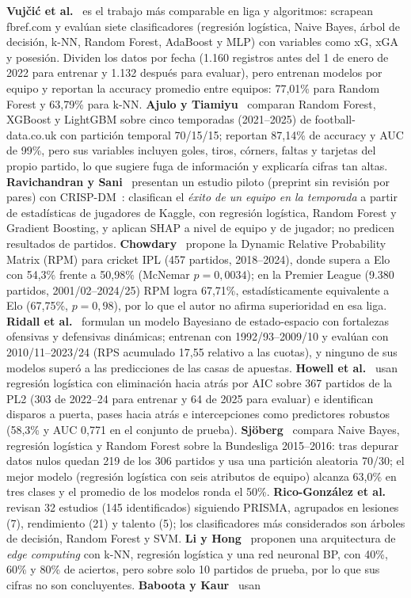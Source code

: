 \documentclass[12pt,letterpaper,oneside]{report}
\begin{document}
\textbf{Vujčić et al.}~\cite{vujcic2026supervised} es el trabajo más comparable en liga y algoritmos: scrapean fbref.com y evalúan siete clasificadores (regresión logística, Naive Bayes, árbol de decisión, k-NN, Random Forest, AdaBoost y MLP) con variables como xG, xGA y posesión. Dividen los datos por fecha (1.160 registros antes del 1 de enero de 2022 para entrenar y 1.132 después para evaluar), pero entrenan modelos por equipo y reportan la accuracy promedio entre equipos: 77,01\% para Random Forest y 63,79\% para k-NN. \textbf{Ajulo y Tiamiyu}~\cite{ajulo2026ml} comparan Random Forest, XGBoost y LightGBM sobre cinco temporadas (2021--2025) de football-data.co.uk con partición temporal 70/15/15; reportan 87,14\% de accuracy y AUC de 99\%, pero sus variables incluyen goles, tiros, córners, faltas y tarjetas del propio partido, lo que sugiere fuga de información y explicaría cifras tan altas. \textbf{Ravichandran y Sani}~\cite{ravichandran2026framework} presentan un estudio piloto (preprint sin revisión por pares) con CRISP-DM~\cite{wirth2000crisp}: clasifican el \textit{éxito de un equipo en la temporada} a partir de estadísticas de jugadores de Kaggle, con regresión logística, Random Forest y Gradient Boosting, y aplican SHAP a nivel de equipo y de jugador; no predicen resultados de partidos. \textbf{Chowdary}~\cite{chowdary2026dynamic} propone la Dynamic Relative Probability Matrix (RPM) para cricket IPL (457 partidos, 2018--2024), donde supera a Elo con 54,3\% frente a 50,98\% (McNemar $p=0{,}0034$); en la Premier League (9.380 partidos, 2001/02--2024/25) RPM logra 67,71\%, estadísticamente equivalente a Elo (67,75\%, $p=0{,}98$), por lo que el autor no afirma superioridad en esa liga. \textbf{Ridall et al.}~\cite{ridall2025bayesian} formulan un modelo Bayesiano de estado-espacio con fortalezas ofensivas y defensivas dinámicas; entrenan con 1992/93--2009/10 y evalúan con 2010/11--2023/24 (RPS acumulado 17,55 relativo a las cuotas), y ninguno de sus modelos superó a las predicciones de las casas de apuestas. \textbf{Howell et al.}~\cite{howell2026winning} usan regresión logística con eliminación hacia atrás por AIC sobre 367 partidos de la PL2 (303 de 2022--24 para entrenar y 64 de 2025 para evaluar) e identifican disparos a puerta, pases hacia atrás e intercepciones como predictores robustos (58,3\% y AUC 0,771 en el conjunto de prueba). \textbf{Sjöberg}~\cite{sjoborg2023football} compara Naive Bayes, regresión logística y Random Forest sobre la Bundesliga 2015--2016: tras depurar datos nulos quedan 219 de los 306 partidos y usa una partición aleatoria 70/30; el mejor modelo (regresión logística con seis atributos de equipo) alcanza 63,0\% en tres clases y el promedio de los modelos ronda el 50\%. \textbf{Rico-González et al.}~\cite{ricogonzalez2023ml} revisan 32 estudios (145 identificados) siguiendo PRISMA, agrupados en lesiones (7), rendimiento (21) y talento (5); los clasificadores más considerados son árboles de decisión, Random Forest y SVM. \textbf{Li y Hong}~\cite{li2022football} proponen una arquitectura de \textit{edge computing} con k-NN, regresión logística y una red neuronal BP, con 40\%, 60\% y 80\% de aciertos, pero sobre solo 10 partidos de prueba, por lo que sus cifras no son concluyentes. \textbf{Baboota y Kaur}~\cite{baboota2019predictive} usan 
\end{document}
